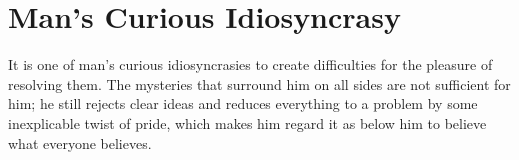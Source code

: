 \section{Man’s Curious Idiosyncrasy}

\begin{quotex}
It is one of man's curious idiosyncrasies to create difficulties for the pleasure of resolving them. The mysteries that surround him on all sides are not sufficient for him; he still rejects clear ideas and reduces everything to a problem by some inexplicable twist of pride, which makes him regard it as below him to believe what everyone believes.
\end{quotex}


